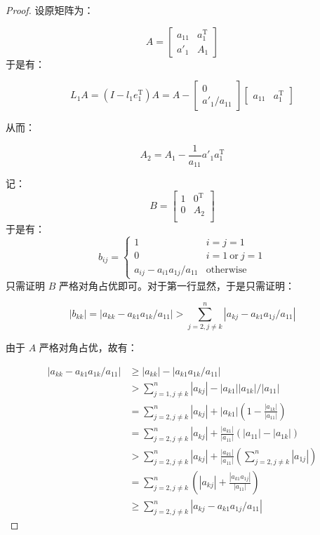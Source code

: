 \documentclass{article}
\newcommand{\T}{\mathrm{T}}
\newcommand{\vecTwo}[2]{
  \begin{bmatrix}
    #1 \\
    #2
\end{bmatrix}}
\newcommand{\vecTwoH}[2]{
  \begin{bmatrix}
    #1 & #2
  \end{bmatrix}
}
\begin{document}
\begin{proof}
  设原矩阵为：

  \[
    A =
    \begin{bmatrix}
      a_{11} & a_1^{\T} \\
      a'_1 & A_1
    \end{bmatrix}
  \]
  于是有：

  \[
    L_1 A = (I - l_1 e_1^{\T}) A
    = A - \vecTwo{0}{a'_1/a_{11}} \vecTwoH{a_{11}}{a_1^{\T}}
  \]

  从而：

  \[
    A_2 = A_1 - \frac{1}{a_{11}} a'_1 a_1^{\T}
  \]

  记：
  \[
    B =
    \begin{bmatrix}
      1 & 0^{\T} \\
      0 & A_2 \\
    \end{bmatrix}
  \]
  于是有：
  \[
    b_{ij} =
    \begin{cases}
      1 & i = j = 1 \\
      0 & i = 1 \ \text{or}\ j = 1 \\
      a_{ij} - a_{i1} a_{1j} / a_{11} & \text{otherwise}
    \end{cases}
  \]
  只需证明 $B$ 严格对角占优即可。对于第一行显然，于是只需证明：

  \[
    |b_{kk}| = |a_{kk} - a_{k1}a_{1k} / a_{11}| > \sum_{j=2, j\neq k}^{n} |a_{kj} - a_{k1}a_{1j} / a_{11}|
  \]

  由于 $A$ 严格对角占优，故有：

  \[
    \begin{aligned}
      |a_{kk} - a_{k1}a_{1k} / a_{11}|
      &\geq |a_{kk}| - |a_{k1}a_{1k} / a_{11}| \\
      &> \sum_{j=1, j\neq k}^{n} |a_{kj}| - |a_{k1}||a_{1k}| / |a_{11}| \\
      &= \sum_{j=2, j\neq k}^{n} |a_{kj}| + |a_{k1}| (1 - \frac{|a_{1k}|}{|a_{11}|}) \\
      &= \sum_{j=2, j\neq k}^{n} |a_{kj}| + \frac{|a_{k1}|}{|a_{11}|} (|a_{11}| - |a_{1k}|) \\
      &> \sum_{j=2, j\neq k}^{n} |a_{kj}| + \frac{|a_{k1}|}{|a_{11}|} (\sum_{j=2, j\neq k}^{n} |a_{1j}|) \\
      &= \sum_{j=2, j\neq k}^{n} (|a_{kj}| + \frac{|a_{k1}a_{1j}|}{|a_{11}|}) \\
      &\geq \sum_{j=2, j\neq k}^{n} |a_{kj} - a_{k1}a_{1j} / a_{11}|
    \end{aligned}
  \]

\end{proof}
\end{document}
